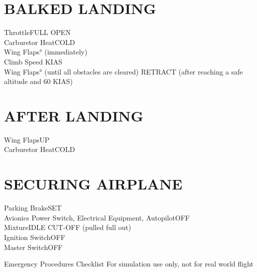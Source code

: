 \documentclass{article}
\begin{document}
\begin{multicols*}{2}
\section*{BALKED LANDING}
Throttle\dotfill FULL OPEN\\
Carburetor Heat\dotfill COLD\\
Wing Flaps° (immediately)\\
Climb Speed KIAS\\
Wing Flaps° (until all obstacles are cleared) RETRACT (after reaching a safe altitude and 60 KIAS)\\
\section*{AFTER LANDING}
Wing Flaps\dotfill UP\\
Carburetor Heat\dotfill COLD\\
\section*{SECURING AIRPLANE}
Parking Brake\dotfill SET\\
Avionics Power Switch, Electrical Equipment, Autopilot\dotfill OFF\\
Mixture\dotfill IDLE CUT-OFF (pulled full out)\\
Ignition Switch\dotfill OFF\\
Master Switch\dotfill OFF
\end{multicols*}
\newpage
\centering
{\fontsize{20.74}{70}\selectfont Emergency Procedures Checklist}
\break
\color{Red}
{\fontsize{10}{70}\selectfont For simulation use only, not for real world flight}
\end{document}
